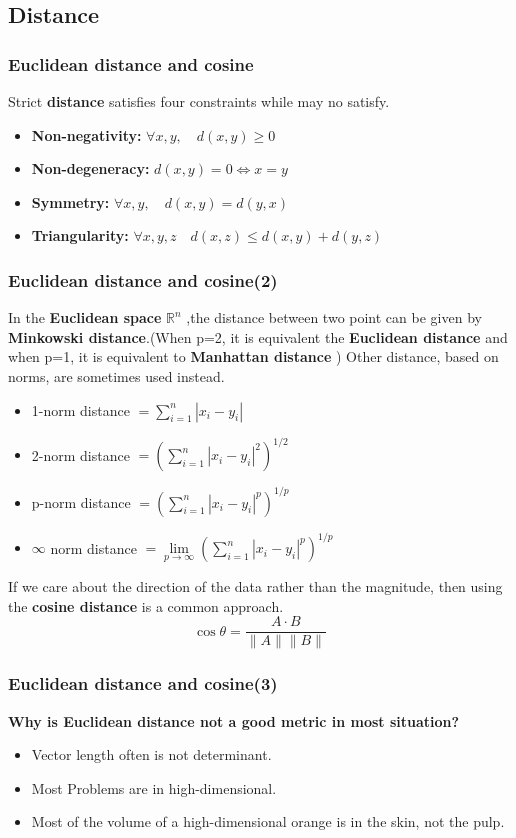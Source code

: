 \documentclass[slidestop,compress,mathserif]{beamer}
\begin{document}
	\subsection{Distance}
	\begin{frame}
		\frametitle{Euclidean distance and cosine}
		Strict \textbf{distance} satisfies four constraints while  may no satisfy.
		\begin{itemize}
			\item \textbf{Non-negativity:} $\forall x,y,\quad d(x,y) \ge 0$
			\item \textbf{Non-degeneracy:} $d(x,y)=0 \Leftrightarrow x=y$
			\item \textbf{Symmetry:} $\forall x,y, \quad d(x,y)=d(y,x)$
			\item \textbf{Triangularity:} $\forall x,y,z \quad d(x,z)\leq d(x,y)+d(y,z)$
		\end{itemize}
		\begin{figure}
		\end{figure}
			
	\end{frame}
		
	\begin{frame}
		\frametitle{Euclidean distance and cosine(2)}
		In the \textbf{Euclidean space} $\mathbb{R}^n$ ,the distance between two point can be given by \textbf{Minkowski distance}.(When p=2, it is equivalent the \textbf{Euclidean distance} and when p=1, it is equivalent to \textbf{Manhattan distance} ) Other distance, based on norms, are sometimes used instead.
		\begin{itemize}
			\item 1-norm distance  $= \sum_{i=1}^{n}|x_i-y_i|$
			\item 2-norm distance  $= \left(\sum_{i=1}^{n}|x_i-y_i|^2\right)^{1/2}$
			\item p-norm distance  $=  \left(\sum_{i=1}^{n}|x_i-y_i|^p\right)^{1/p}$
			\item $\infty$ norm distance $=\lim\limits_{p\rightarrow\infty}\left(\sum_{i=1}^{n}|x_i-y_i|^p\right)^{1/p}$
		\end{itemize}
		If we care about the direction of the data rather than the magnitude, then using the \textbf{cosine distance} is a common approach. 
		$$\cos \theta = \frac{A\cdot B}{\|A\|\|B\|}$$
	\end{frame}
	
	\begin{frame}
		\frametitle{Euclidean distance and cosine(3)}
		\textbf{Why is Euclidean distance not a good metric in most situation?}
		\begin{itemize}
			\item Vector length often is not determinant.
			\item Most Problems are in high-dimensional.
			\item Most of the volume of a high-dimensional orange is in the skin, not the pulp.
		\end{itemize}
	\end{frame}
	
\end{document}
